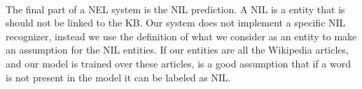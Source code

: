 \pagebreak

\paragraph{}
The final part of a NEL system is the NIL prediction. A NIL is a entity that is should not be linked to the KB. Our system does not implement a specific NIL recognizer, instead we use the definition of what we consider as an entity to make an assumption for the NIL entities. If our entities are all the Wikipedia articles, and our model is trained over these articles, is a good assumption that if a word is not present in the model it can be labeled as NIL.  


